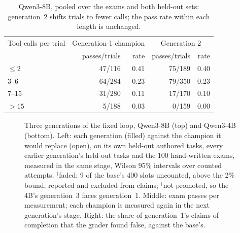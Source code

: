 \begin{table}[htbp]
\centering\footnotesize
\begin{tabular}{@{}lrrrr@{}}
\toprule
Tool calls per trial & \multicolumn{2}{c}{Generation-1 champion} & \multicolumn{2}{c}{Generation 2} \\
 & passes/trials & rate & passes/trials & rate \\
\midrule
$\le 2$ & 47/116 & 0.41 & 75/189 & 0.40 \\
3--6 & 64/284 & 0.23 & 79/350 & 0.23 \\
7--15 & 31/280 & 0.11 & 17/170 & 0.10 \\
$>15$ & 5/188 & 0.03 & 0/159 & 0.00 \\
\bottomrule
\end{tabular}
\caption{Qwen3-8B, pooled over the exams and both held-out sets: generation~2 shifts trials to fewer calls; the pass rate
within each length is unchanged.}\label{tab:calls}
\end{table}

\begin{figure}[htbp]
\centering

\caption{Three generations of the fixed loop, Qwen3-8B (top) and Qwen3-4B (bottom). Left: each generation (filled) against
the champion it would replace (open), on its own held-out authored tasks, every earlier generation's held-out tasks and the 100
hand-written exams, measured in the same stage, Wilson 95\% intervals over counted attempts; $^\dagger$faded: 9 of the base's
400 slots uncounted, above the 2\% bound, reported and excluded from claims; $^\ddagger$not promoted, so the 4B's generation~3
faces generation~1. Middle: exam passes per measurement; each champion is measured again in the next generation's stage.
Right: the share of generation~1's claims of completion that the grader found false, against the base's.}\label{fig:rerun}
\end{figure}

